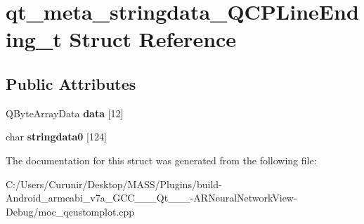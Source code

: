 \hypertarget{structqt__meta__stringdata___q_c_p_line_ending__t}{}\section{qt\+\_\+meta\+\_\+stringdata\+\_\+\+Q\+C\+P\+Line\+Ending\+\_\+t Struct Reference}
\label{structqt__meta__stringdata___q_c_p_line_ending__t}
\subsection*{Public Attributes}
\begin{DoxyCompactItemize}
\item 
\mbox{\label{structqt__meta__stringdata___q_c_p_line_ending__t_a221f60569cc9a7b1163170c7c37c039a}} 
Q\+Byte\+Array\+Data {\bfseries data} \mbox{[}12\mbox{]}
\item 
\mbox{\label{structqt__meta__stringdata___q_c_p_line_ending__t_a1128e2f129cf4d4bc79f57194aa390f0}} 
char {\bfseries stringdata0} \mbox{[}124\mbox{]}
\end{DoxyCompactItemize}


The documentation for this struct was generated from the following file\+:\begin{DoxyCompactItemize}
\item 
C\+:/\+Users/\+Curunir/\+Desktop/\+M\+A\+S\+S/\+Plugins/build-\/\+Android\+\_\+armeabi\+\_\+v7a\+\_\+\+G\+C\+C\+\_\+\_\+\_\+\+Qt\+\_\+\_\+\_-\/\+A\+R\+Neural\+Network\+View-\/\+Debug/moc\+\_\+qcustomplot.\+cpp\end{DoxyCompactItemize}
